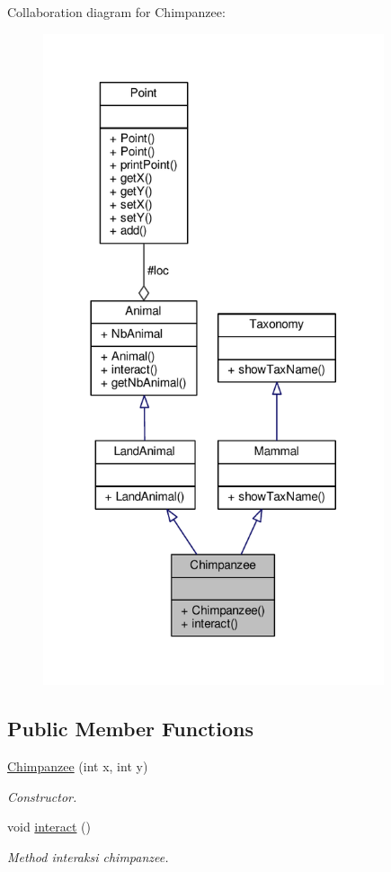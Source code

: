 Collaboration diagram for Chimpanzee\+:
\nopagebreak
\begin{figure}[H]
\begin{center}
\leavevmode
\includegraphics[width=284pt]{classChimpanzee__coll__graph}
\end{center}
\end{figure}
\subsection*{Public Member Functions}
\begin{DoxyCompactItemize}
\item 
\hyperlink{classChimpanzee_a11365fc4d031bf2895834721c060f0b3}{Chimpanzee} (int x, int y)
\begin{DoxyCompactList}\small\item\em Constructor. \end{DoxyCompactList}\item 
void \hyperlink{classChimpanzee_aade8161c7bcd697eae3d5a3559f6d976}{interact} ()\hypertarget{classChimpanzee_aade8161c7bcd697eae3d5a3559f6d976}{}\label{classChimpanzee_aade8161c7bcd697eae3d5a3559f6d976}

\begin{DoxyCompactList}\small\item\em Method interaksi chimpanzee. \end{DoxyCompactList}\end{DoxyCompactItemize}
